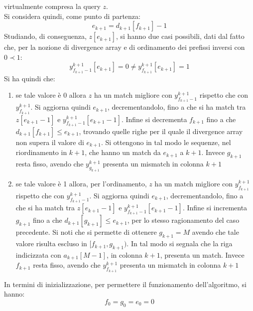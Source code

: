 \begin{enumerate}
  virtualmente compresa la query $z$. \\
  Si considera quindi, come punto di partenza:
  \begin{equation}
    \label{eq:pbwtsmem3}
    e_{k+1}=d_{k+1}[f_{k+1}]-1
  \end{equation}
  Studiando, di conseguenza, $z[e_{k+1}]$, si hanno due casi possibili, dati dal
  fatto che, per la nozione di divergence array e di ordinamento dei
  prefissi inversi con $0\prec 1$:
  \begin{equation}
    \label{eq:pbwtsmem4}
    y_{f_{k+1}-1}^{k+1}[e_{k+1}]=0\neq y_{f_{k+1}}^{k+1}[e_{k+1}]=1
  \end{equation}
  Si ha quindi che:
  \begin{enumerate}
    \item se tale valore è 0 allora $z$ ha un match migliore
    con $y_{f_{k+1}-1}^{k+1}$ rispetto che con $y_{f_{k+1}}^{k+1}$. Si aggiorna
    quindi $e_{k+1}$, decrementandolo, fino a che si ha match tra $z[e_{k+1}-1]$
    e $y_{f_{k+1}-1}^{k+1}[e_{k+1}-1]$. Infine si decrementa $f_{k+1}$ fino a
    che $d_{k+1}[f_{k+1}]\leq e_{k+1}$, trovando quelle righe per il quale il
    divergence array non supera il valore di $e_{k+1}$. Si ottengono in
    tal modo le sequenze, nel riordinamento in $k+1$, che hanno un match da
    $e_{k+1}$ a $k+1$. Invece $g_{k+1}$ resta fisso, avendo che
    $y_{g_{k+1}}^{k+1}$ presenta un
    mismatch in colonna $k+1$
    \item se tale valore è 1 allora, per l'ordinamento, $z$ ha un match migliore
    con $y_{f_{k+1}}^{k+1}$ rispetto che con $y_{f_{k+1}-1}^{k+1}$. Si aggiorna
    quindi $e_{k+1}$, decrementandolo, fino a che si ha match tra $z[e_{k+1}-1]$
    e $y_{f_{k+1}-1}^{k+1}[e_{k+1}-1]$. Infine si incrementa $g_{k+1}$ fino a
    che $d_{k+1}[g_{k+1}]\leq e_{k+1}$, per lo stesso ragionamento del caso
    precedente. Si noti che si permette di ottenere $g_{k+1}=M$ avendo che tale
    valore risulta escluso in $[f_{k+1},g_{k+1})$. In tal modo si segnala che la
    riga indicizzata con $a_{k+1}[M-1]$, in colonna $k+1$, presenta un
    match. Invece $f_{k+1}$ resta fisso, avendo che $y_{f_{k+1}}^{k+1}$ 
    presenta un mismatch in colonna $k+1$ 
  \end{enumerate}
\end{enumerate}
In termini di inizializzazione, per permettere il funzionamento dell'algoritmo,
si hanno: 
\[f_0=g_0=e_0=0\]


